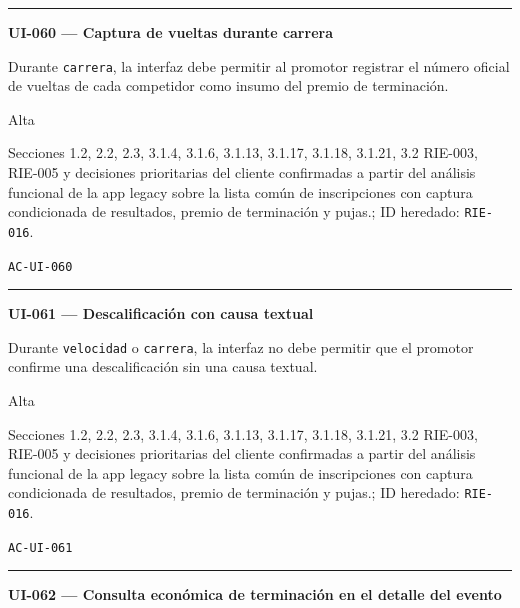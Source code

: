 \documentclass[10pt,letterpaper]{article}
\begin{document}
\vspace{0.25em}\hrule\vspace{0.65em}
\noindent\textbf{UI-060 --- Captura de vueltas durante carrera}\par
\begin{description}[style=nextline,leftmargin=3.15cm,labelwidth=2.8cm,font=\normalfont\bfseries]
\item[Obligación] Durante \texttt{carrera}, la interfaz debe permitir al promotor registrar el número oficial de vueltas de cada competidor como insumo del premio de terminación.
\item[Prioridad] Alta
\item[Procedencia] Secciones 1.2, 2.2, 2.3, 3.1.4, 3.1.6, 3.1.13, 3.1.17, 3.1.18, 3.1.21, 3.2 RIE-003, RIE-005 y decisiones prioritarias del cliente confirmadas a partir del análisis funcional de la app legacy sobre la lista común de inscripciones con captura condicionada de resultados, premio de terminación y pujas.; ID heredado: \texttt{RIE-016}.
\item[Verificación] \texttt{AC-UI-060}
\end{description}
\vspace{0.25em}\hrule\vspace{0.65em}
\noindent\textbf{UI-061 --- Descalificación con causa textual}\par
\begin{description}[style=nextline,leftmargin=3.15cm,labelwidth=2.8cm,font=\normalfont\bfseries]
\item[Obligación] Durante \texttt{velocidad} o \texttt{carrera}, la interfaz no debe permitir que el promotor confirme una descalificación sin una causa textual.
\item[Prioridad] Alta
\item[Procedencia] Secciones 1.2, 2.2, 2.3, 3.1.4, 3.1.6, 3.1.13, 3.1.17, 3.1.18, 3.1.21, 3.2 RIE-003, RIE-005 y decisiones prioritarias del cliente confirmadas a partir del análisis funcional de la app legacy sobre la lista común de inscripciones con captura condicionada de resultados, premio de terminación y pujas.; ID heredado: \texttt{RIE-016}.
\item[Verificación] \texttt{AC-UI-061}
\end{description}
\vspace{0.25em}\hrule\vspace{0.65em}
\noindent\textbf{UI-062 --- Consulta económica de terminación en el detalle del evento}\par
\end{document}
